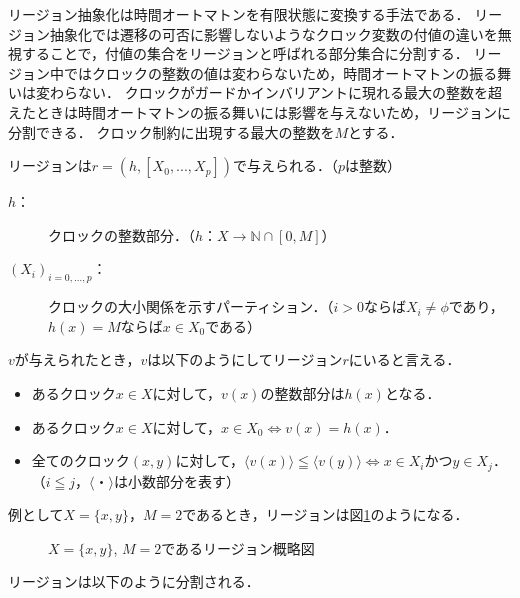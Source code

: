 \documentclass{ieicej}
\begin{document}
リージョン抽象化は時間オートマトンを有限状態に変換する手法である．
リージョン抽象化では遷移の可否に影響しないようなクロック変数の付値の違いを無視することで，付値の集合をリージョンと呼ばれる部分集合に分割する．
リージョン中ではクロックの整数の値は変わらないため，時間オートマトンの振る舞いは変わらない．
クロックがガードかインバリアントに現れる最大の整数を超えたときは時間オートマトンの振る舞いには影響を与えないため，リージョンに分割できる．
クロック制約に出現する最大の整数を$M$とする．

	リージョンは$r=(h, [X_0, ..., X_p])$で与えられる．（$p$は整数）
	\begin{description}
		\item [$h$：] クロックの整数部分．（$h：X \rightarrow \mathbb{N} \cap [0, M]$）
		\item [$(X_i)_{i=0, ..., p}$：] クロックの大小関係を示すパーティション．（$i > 0$ならば$X_i \neq \phi$であり，$h(x) = M$ならば$x \in X_0$である）
	\end{description}

$v$が与えられたとき，$v$は以下のようにしてリージョン$r$にいると言える．
\begin{itemize}
	\item あるクロック$x \in X$に対して，$v(x)$の整数部分は$h(x)$となる．
	\item あるクロック$x \in X$に対して，$x \in X_0 \Longleftrightarrow v(x) = h(x)$．
	\item 全てのクロック$(x, y)$に対して，$\langle v(x)\rangle \leqq \langle v(y)\rangle \Longleftrightarrow x \in X_i$かつ$y \in X_j$．（$i \leqq j$，$\langle・\rangle$は小数部分を表す）
\end{itemize}


例として$X=\{x, y\}$，$M=2$であるとき，リージョンは図\ref{fg:region}のようになる．

\begin{figure}[htbp]
	\begin{center}
		\caption{$X=\{x, y\}$, $M=2$であるリージョン概略図}
		\label{fg:region}
	\end{center}
\end{figure}

リージョンは以下のように分割される．
\end{document}
